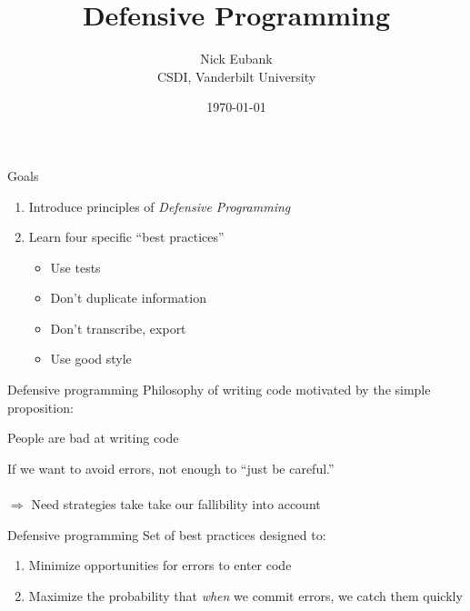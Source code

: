 \documentclass[11pt]{beamer}
\title{Defensive Programming}
\author{    \small Nick Eubank \\
            \scriptsize{CSDI, Vanderbilt University}\vspace*{.15in}}
\date{\vspace*{.3in} \today}
\begin{document}
\begin{frame}
    \maketitle
\end{frame}


\begin{frame}[c]{Goals}
\begin{enumerate}
    \pause \item Introduce principles of \emph{Defensive Programming}\\\vspace{0.1cm}
    \pause \item Learn four specific ``best practices''
    \begin{itemize}
        \item Use tests
        \item Don't duplicate information
        \item Don't transcribe, export
        \item Use good style
    \end{itemize}
\end{enumerate}
\end{frame}

\begin{frame}[c]{Defensive programming}
\pause Philosophy of writing code \pause motivated by the simple proposition: \\

\begin{center}
    \pause \alert{People are bad at writing code}
\end{center}
\pause If we want to avoid errors, \pause not enough to \alert{``just be careful.''}\\
\pause \vspace{0.2cm}\\$\Rightarrow$ Need strategies take take our fallibility into account
\end{frame}


\begin{frame}[c]{Defensive programming}
    Set of best practices designed to:
    \begin{enumerate}
        \pause \item Minimize opportunities for errors to enter code
        \pause \item Maximize the probability that \emph{when} we commit errors, we catch them quickly
    \end{enumerate}
\end{frame}
\end{document}
